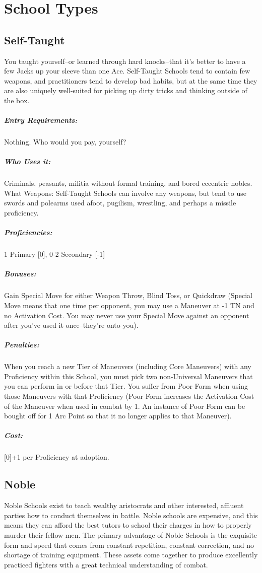 \documentclass[oneside,11pt,english]{book}
\begin{document}
\section{School Types}

\subsection{Self-Taught}
You taught yourself--or learned through hard knocks--that it’s better to have a few Jacks up your sleeve 
than one Ace. Self-Taught Schools tend to contain few weapons, and practitioners tend to develop bad 
habits, but at the same time they are also uniquely well-suited for picking up dirty tricks and thinking 
outside of the box. 

\subparagraph{Entry Requirements:} Nothing. Who would you pay, yourself?
\subparagraph{Who Uses it:} Criminals, peasants, militia without formal training, and bored eccentric nobles. What Weapons: Self-Taught Schools can involve any weapons, but tend to use swords and polearms used afoot, pugilism, wrestling, and perhaps a missile proficiency.
\subparagraph{Proficiencies:} 1 Primary [0], 0-2 Secondary [-1]
\subparagraph{Bonuses:} Gain Special Move for either Weapon Throw, Blind Toss, or Quickdraw (Special Move means that one time per opponent, you may use a Maneuver at -1 TN and no Activation Cost. You may never use your Special Move against an opponent after you’ve used it once--they’re onto you). 
\subparagraph{Penalties:} When you reach a new Tier of Maneuvers (including Core Maneuvers) with any Proficiency within this School, you must pick two non-Universal Maneuvers that you can perform in or before that Tier. You suffer from Poor Form when using those Maneuvers with that Proficiency (Poor Form increases the Activation Cost of the Maneuver when used in combat by 1. An instance of Poor Form can be bought off for 1 Arc Point so that it no longer applies to that Maneuver).
\subparagraph{Cost:} [0]+1 per Proficiency at adoption.

\subsection{Noble}
Noble Schools exist to teach wealthy aristocrats and other interested, affluent parties how to conduct 
themselves in battle. Noble schools are expensive, and this means they can afford the best tutors to school 
their charges in how to properly murder their fellow men. The primary advantage of Noble Schools is the 
exquisite form and speed that comes from constant repetition, constant correction, and no shortage of 
training equipment. These assets come together to produce excellently practiced fighters with a great 
technical understanding of combat. 
\end{document}

